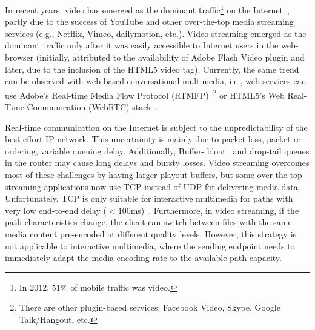 In recent years, video has emerged as the dominant traffic\footnote{In 2012,
$51\%$ of mobile traffic was video.} on the Internet~\cite{cvni.13,dawn.zb},
partly due to the success of YouTube and other over-the-top media streaming
services (e.g., Netflix, Vimeo, dailymotion, etc.). Video streaming emerged as
the dominant traffic only after it was easily accessible to Internet users in
the web-browser (initially, attributed to the availability of Adobe Flash
Video plugin and later, due to the inclusion of the HTML5 video tag).
Currently, the same trend can be observed with web-based conversational
multimedia, i.e., web services can use Adobe's Real-time Media Flow Protocol
(RTMFP)~\cite{draft.rtmfp}\footnote{There are other plugin-based services:
Facebook Video, Skype, Google Talk/Hangout, etc.} or HTML5's Web Real-Time
Communication (WebRTC) stack~\cite{draft.webrtc}.

Real-time communication on the Internet is subject to the unpredictability of
the best-effort IP network. This uncertainity is mainly due to packet loss,
packet re-ordering, variable queuing delay. Additionally, Buffer-%
bloat~\cite{gettys:bufferbloat} and drop-tail queues in the router may cause
long delays and bursty losses. Video streaming overcomes most of these
challenges by having larger playout buffers, but some over-the-top streaming
applications now use TCP instead of UDP for delivering media data.
Unfortunately, TCP is only suitable for interactive multimedia for paths with
very low end-to-end delay ($<100$ms)~\cite{Brosh:tcp-real-time}. Furthermore,
in video streaming, if the path characteristics change, the client can switch
between files with the same media content pre-encoded at different quality
levels. However, this strategy is not applicable to interactive multimedia,
where the sending endpoint needs to immediately adapt the media encoding rate
to the available path capacity.



